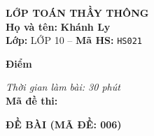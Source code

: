 \noindent
\begin{tcolorbox}[colback=white,colframe=black,arc=0mm,boxrule=0.8pt,top=4pt,bottom=4pt,left=6pt,right=6pt]
	\begin{minipage}[c]{0.44\textwidth}
		{\bfseries\large LỚP TOÁN THẦY THÔNG}\\[3pt]
		\textbf{Họ và tên:} \textbf{\large Khánh Ly}\\[3pt]
		\textbf{Lớp:} LỚP 10 \quad -- \quad \textbf{Mã HS:} \texttt{HS021}
	\end{minipage}
	\hfill
	\begin{minipage}[c]{0.22\textwidth}
		\begin{tcolorbox}[colback=white,colframe=black,arc=0mm,boxrule=0.6pt,height=1.8cm,halign=center,valign=top,top=2pt]
			{\bfseries\normalsize Điểm}
		\end{tcolorbox}
	\end{minipage}
	\hfill
	\begin{minipage}[c]{0.30\textwidth}
		\raggedleft
		\textit{Thời gian làm bài: 30 phút}\\[4pt]
		\textbf{Mã đề thi:} 
	\end{minipage}
\end{tcolorbox}
\vspace{0.25cm}

\noindent\textbf{\large ĐỀ BÀI (MÃ ĐỀ: 006)}
\vspace{0.1cm}

